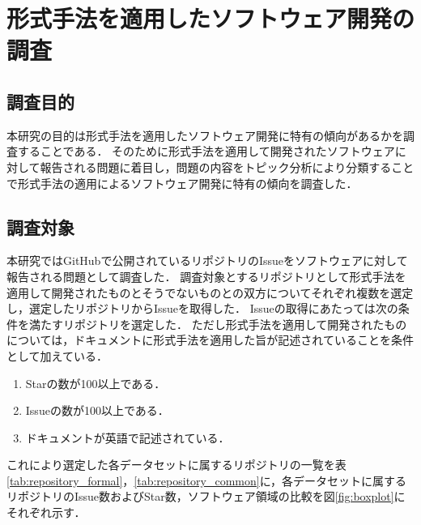 \documentclass[main]{subfiles}
\begin{document}
\chapter{形式手法を適用したソフトウェア開発の調査}

\section{調査目的}

本研究の目的は形式手法を適用したソフトウェア開発に特有の傾向があるかを調査することである．
そのために形式手法を適用して開発されたソフトウェアに対して報告される問題に着目し，問題の内容をトピック分析により分類することで形式手法の適用によるソフトウェア開発に特有の傾向を調査した．

\section{調査対象}
\label{sec:survey-target}

本研究ではGitHubで公開されているリポジトリのIssueをソフトウェアに対して報告される問題として調査した．
調査対象とするリポジトリとして形式手法を適用して開発されたものとそうでないものとの双方についてそれぞれ複数を選定し，選定したリポジトリからIssueを取得した．
Issueの取得にあたっては次の条件を満たすリポジトリを選定した．
ただし形式手法を適用して開発されたものについては，ドキュメントに形式手法を適用した旨が記述されていることを条件として加えている．

\begin{enumerate}
	\item Starの数が100以上である．
	\item Issueの数が100以上である．
	\item ドキュメントが英語で記述されている．
\end{enumerate}

これにより選定した各データセットに属するリポジトリの一覧を表\ref{tab:repository_formal}，\ref{tab:repository_common}に，各データセットに属するリポジトリのIssue数およびStar数，ソフトウェア領域の比較を図\ref{fig:boxplot}にそれぞれ示す．


\end{document}
